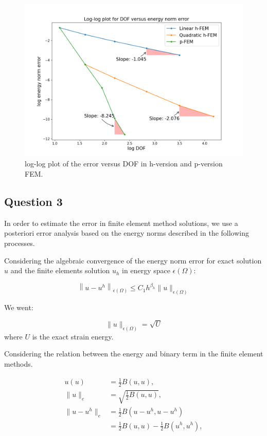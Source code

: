 \documentclass[twoside,twocolumn,10pt]{article}
\begin{document}
\begin{figure}[!ht]
  \centering
  \includegraphics[width=1.\linewidth]{Q1/h_p_error.png}
  \caption{ log-log plot of the error versus DOF in h-version and p-version FEM.}
  \label{fig:h_p_error}
\end{figure}

\subsection{Question 3}

In order to estimate the error in finite element method solutions, we use a posteriori error analysis based on the energy norms described in the following processes.

Considering the algebraic convergence of the energy norm error for exact solution $u$ and the finite elements solution $u_h$ in energy space $\epsilon(\Omega)$:

\begin{equation}
  \left\|u-u^h\right\|_{\epsilon(\Omega)} \leqslant C_1 h^{\beta_h}\|u\|_{\epsilon(\Omega)}
\end{equation}

We went:

\begin{equation}
 \|u\|_{\epsilon(\Omega)} = \sqrt{U}
\end{equation}
where $U$ is the exact strain energy.

Considering the relation between the energy and binary term in the finite element methods.

\begin{equation}
  \begin{aligned}
  u(u) &= \frac{1}{2} B(u, u), \\
  \|u\|_e &= \sqrt{\frac{1}{2} B(u, u)}, \\
  \|u-u^h\|_e &= \frac{1}{2} B\left(u-u^h, u-u^h\right) \\
  &= \frac{1}{2} B(u, u) - \frac{1}{2} B\left(u^h, u^h\right), \\
\end{aligned}
\end{equation}
\end{document}
